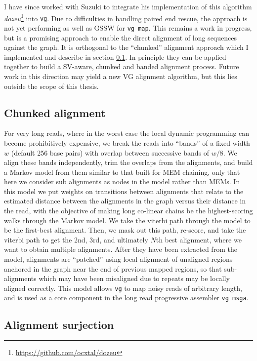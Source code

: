 I have since worked with Suzuki to integrate his implementation of this algorithm \emph{dozeu}\footnote{\url{https://github.com/ocxtal/dozeu}} into {\tt vg}.
Due to difficulties in handling paired end rescue, the approach is not yet performing as well as GSSW for {\tt vg map}.
This remains a work in progress, but is a promising approach to enable the direct alignment of long sequences against the graph.
It is orthogonal to the ``chunked'' alignment approach which I implemented and describe in section \ref{sec:chunked_alignment}.
In principle they can be applied together to build a SV-aware, chunked and banded alignment process.
Future work in this direction may yield a new VG alignment algorithm, but this lies outside the scope of this thesis.

\subsection{Chunked alignment}
\label{sec:chunked_alignment}

For very long reads, where in the worst case the local dynamic programming can become prohibitively expensive, we break the reads into ``bands'' of a fixed width $w$ (default 256 base pairs) with overlap between successive bands of $w/8$.
We align these bands independently, trim the overlaps from the alignments, and build a Markov model from them similar to that built for MEM chaining, 
only that here we consider sub alignments as nodes in the model rather than MEMs. 
In this model we put weights on transitions between alignments that relate to the estimated distance between the alignments in the graph versus their distance in the read, with the objective of making long co-linear chains be the highest-scoring walks through the Markov model.
We take the viterbi path through the model to be the first-best alignment.
Then, we mask out this path, re-score, and take the viterbi path to get the 2nd, 3rd, and ultimately $N$th best alignment, where we want to obtain multiple alignments. 
After they have been extracted from the model, alignments are ``patched'' using local alignment of unaligned regions anchored in the graph near the end of previous mapped regions, so that sub-alignments which may have been misaligned due to repeats may be locally aligned correctly.
This model allows {\tt vg} to map noisy reads of arbitrary length, and is used as a core component in the long read progressive assembler {\tt vg msga}.


\subsection{Alignment surjection}



